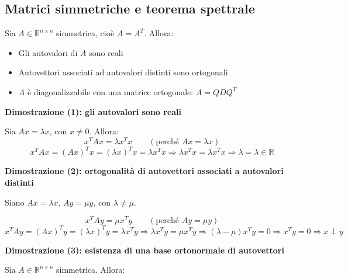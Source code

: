 \documentclass[12pt,a4paper]{article}
\begin{document}
\subsection*{Matrici simmetriche e teorema spettrale}

Sia \( A \in \mathbb{R}^{n \times n} \) simmetrica, cioè \( A = A^T \). Allora:

\begin{itemize}
  \item Gli autovalori di \( A \) sono reali
  \item Autovettori associati ad autovalori distinti sono ortogonali
  \item \( A \) è diagonalizzabile con una matrice ortogonale: \( A = Q D Q^T \)
\end{itemize}

\vspace{0.5em}
\textbf{Dimostrazione (1): gli autovalori sono reali}

Sia \( Ax = \lambda x \), con \( x \ne 0 \). Allora:
\[
x^T A x = \lambda x^T x \qquad (\text{perché } Ax = \lambda x)
\]
\[
x^T A x = (Ax)^T x = (\lambda x)^T x = \overline{\lambda} x^T x
\Rightarrow \lambda x^T x = \overline{\lambda} x^T x
\Rightarrow \lambda = \overline{\lambda} \in \mathbb{R}
\]

\vspace{0.5em}
\textbf{Dimostrazione (2): ortogonalità di autovettori associati a autovalori distinti}

Siano \( Ax = \lambda x \), \( Ay = \mu y \), con \( \lambda \ne \mu \).

\[
x^T A y = \mu x^T y \qquad (\text{perché } Ay = \mu y)
\]
\[
x^T A y = (A x)^T y = (\lambda x)^T y = \lambda x^T y
\Rightarrow \lambda x^T y = \mu x^T y
\Rightarrow (\lambda - \mu) x^T y = 0
\Rightarrow x^T y = 0
\Rightarrow x \perp y
\]

\vspace{0.5em}
\textbf{Dimostrazione (3): esistenza di una base ortonormale di autovettori}

Sia \( A \in \mathbb{R}^{n \times n} \) simmetrica. Allora:
\end{document}
